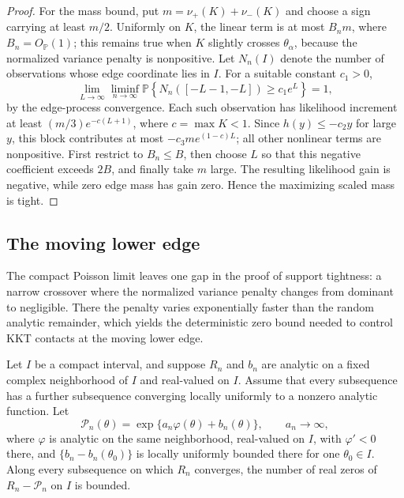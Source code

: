 \begin{proof}
For the mass bound, put \(m=\nu_+(K)+\nu_-(K)\) and choose a sign carrying at
least \(m/2\). Uniformly on \(K\), the linear term is at most
\(B_nm\), where \(B_n=O_{\mathbb P}(1)\); this remains true when \(K\)
slightly crosses \(\theta_\alpha\), because the normalized variance penalty
is nonpositive. Let \(N_n(I)\) denote the number of observations whose edge
coordinate lies in \(I\). For a suitable constant \(c_1>0\),
\[
    \lim_{L\to\infty}\liminf_{n\to\infty}
    \mathbb P\!\left\{N_n([-L-1,-L])\ge c_1e^L\right\}=1,
\]
by the edge-process convergence. Each such observation has likelihood
increment at least \((m/3)e^{-c(L+1)}\), where \(c=\max K<1\). Since
\(h(y)\le-c_2y\) for large \(y\), this block contributes at most
\(-c_3me^{(1-c)L}\); all other nonlinear terms are nonpositive. First
restrict to \(B_n\le B\), then choose \(L\) so that this negative coefficient
exceeds \(2B\), and finally take \(m\) large. The resulting likelihood gain
is negative, while zero edge mass has gain zero. Hence the maximizing scaled
mass is tight.
\end{proof}

\subsection{The moving lower edge}

The compact Poisson limit leaves one gap in the proof of support tightness: a
narrow crossover where the normalized variance penalty changes from dominant
to negligible. There the penalty varies exponentially faster than the random
analytic remainder, which yields the deterministic zero bound needed to
control KKT contacts at the moving lower edge.
\begin{lemma}
\label{lem:support-steep-crossing}
Let \(I\) be a compact interval, and suppose \(R_n\) and \(b_n\) are analytic
on a fixed complex neighborhood of \(I\) and real-valued on \(I\). Assume
that every subsequence has a further subsequence
converging locally uniformly to a nonzero analytic function. Let
\[
    \mathcal P_n(\theta)=\exp\{a_n\varphi(\theta)+b_n(\theta)\},
    \qquad a_n\to\infty,
\]
where \(\varphi\) is analytic on the same neighborhood, real-valued on \(I\),
with \(\varphi'<0\) there, and
\(\{b_n-b_n(\theta_0)\}\) is locally uniformly bounded there for one
\(\theta_0\in I\). Along every subsequence on which \(R_n\) converges, the
number of real zeros of \(R_n-\mathcal P_n\) on \(I\) is bounded.
\end{lemma}

